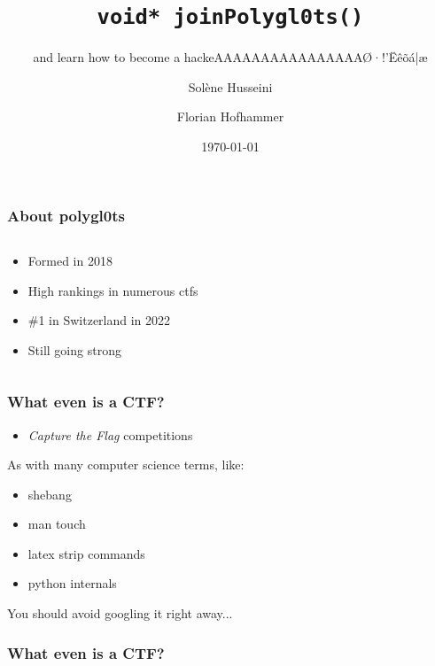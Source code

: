 \documentclass[aspectratio=169]{beamer}
\title{\texttt{void* joinPolygl0ts()}}
\subtitle{and learn how to become a hackeAAAAAAAAAAAAAAAAØ·!'Ëêõá|æ}
\author{Sol\`ene Husseini \and Florian Hofhammer}
\date{\today}
\begin{document}
\titleframe

\begin{frame}
    \frametitle{About polygl0ts}
    \begin{columns}
        \begin{column}{0.5\textwidth}
            \begin{itemize}
                \item Formed in 2018
				\item High rankings in numerous ctfs
				\item \#1 in Switzerland in 2022
				\item Still going strong
            \end{itemize}
        \end{column}
        \begin{column}{0.5\textwidth}
            
        \end{column}
    \end{columns}
\end{frame}

\begin{frame}
	\frametitle{What even is a CTF?}
	\begin{itemize}
		\item \textit{Capture the Flag} competitions
	\end{itemize}
	\pause
	\vspace{2em}
	As with many computer science terms, like:
	\begin{itemize}
		\item shebang
		\item man touch
		\item latex strip commands
		\item python internals
	\end{itemize}
	You should avoid googling it right away...
\end{frame}

\begin{frame}
	\frametitle{What even is a CTF?}
	\begin{center}
	\end{center}
\end{frame}
\end{document}
